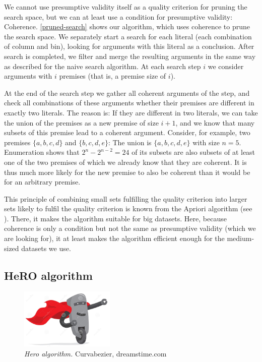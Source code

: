 We cannot use presumptive validity itself as a quality criterion for pruning the search space, but we can at least use a condition for presumptive validity: Coherence. \autoref{pruned-search} shows our algorithm, which uses coherence to prune the search space. We separately start a search for each literal (each combination of column and bin), looking for arguments with this literal as a conclusion. After search is completed, we filter and merge the resulting arguments in the same way as described for the naive search algorithm. At each search step $i$ we consider arguments with $i$ premises (that is, a premise size of $i$). 

At the end of the search step we gather all coherent arguments of the step, and check all combinations of these arguments whether their premises are different in exactly two literals. The reason is: If they are different in two literals, we can take the union of the premises as a new premise of size $i+1$, and we know that many subsets of this premise lead to a coherent argument. Consider, for example, two premises $\{a,b,c,d\}$ and $\{b,c,d,e\}$: The union is $\{a,b,c,d,e\}$ with size $n=5$. Enumeration shows that $2^n-2^{n-2} = 24$ of its subsets are also subsets of at least one of the two premises of which we already know that they are coherent. It is thus much more likely for the new premise to also be coherent than it would be for an arbitrary premise. 

This principle of combining small sets fulfilling the quality criterion into larger sets likely to fulfil the quality criterion is known from the Apriori algorithm (see \cite{tanIntroductionDataMining2014}). There, it makes the algorithm suitable for big datasets. Here, because coherence is only a condition but not the same as presumptive validity (which we are looking for), it at least makes the algorithm efficient enough for the medium-sized datasets we use.

\label{hero-meth}
\subsection{HeRO algorithm}

\begin{figure}[htb]
        \centering
        \includegraphics[width=0.4\textwidth]{images/hero.jpg}
        \caption{\textit{Hero algorithm.} \textcopyright Curvabezier, dreamstime.com}
        \label{fig:hero}
\end{figure}

